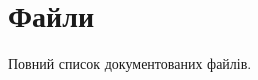 \section{Файли}
Повний список документованих файлів.\begin{DoxyCompactList}
\item{}
\end{DoxyCompactList}
